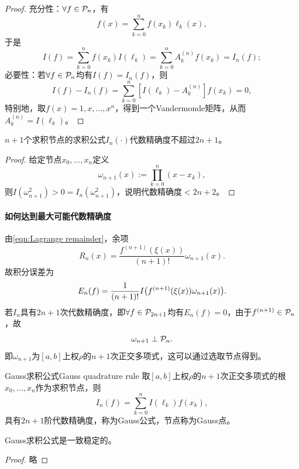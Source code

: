 \begin{proof}
    充分性：$\forall f \in \mathcal{P}_n$，有
    \[
        f(x) = \sum_{k=0}^nf(x_k)\ell_k(x),
    \]
    于是
    \[
        I(f) = \sum_{k=0}^nf(x_k)I(\ell_k) = \sum_{k=0}^nA_k^{(n)}f(x_k) = I_n(f);
    \]
    必要性：若$\forall f \in \mathcal{P}_n$均有$I(f) = I_n(f)$，则
    \[
        I(f) - I_n(f) = \sum_{k=0}^n[I(\ell_k) - A_k^{(n)}]f(x_k) = 0,
    \]
    特别地，取$f(x) = 1,x,\ldots,x^n$，得到一个Vandermonde矩阵，从而$A_k^{(n)} = I(\ell_k)$。
\end{proof}

\begin{theorem}
    {}{}
    $n + 1$个求积节点的求积公式$I_n(\cdot)$代数精确度不超过$2n + 1$。
\end{theorem}

\begin{proof}
    给定节点$x_0,\ldots,x_n$定义
    \begin{equation}\label{eq:na-nodal-polynomial}
        \omega_{n+1}(x) := \prod_{k=0}^n(x - x_k),
    \end{equation}
    则$I(\omega_{n+1}^2) > 0 = I_n(\omega_{n+1}^2)$，说明代数精确度$< 2n + 2$。
\end{proof}

\paragraph{如何达到最大可能代数精确度}

由\eqref{eqn:Lagrange remainder}，余项
\[
    R_n(x) = \frac{f^{(n+1)}(\xi(x))}{(n + 1)!}\omega_{n+1}(x).
\]
故积分误差为
\begin{equation}\label{eq:na-interpolation-quadrature-error}
    E_n(f) = \frac1{(n + 1)!}I\bigl(f^{(n+1)}(\xi(x))\omega_{n+1}(x)\bigr).
\end{equation}
若$I_n$具有$2n + 1$次代数精确度，即$\forall f \in \mathcal{P}_{2n+1}$均有$E_n(f) = 0$，由于$f^{(n+1)} \in \mathcal{P}_n$，故
\begin{equation}
    \omega_{n+1} \perp \mathcal{P}_n.
\end{equation}
即$\omega_{n+1}$为$[a,b]$上权$\rho$的$n + 1$次正交多项式，这可以通过选取节点得到。

\begin{theorem}
    {Gauss求积公式}{Gauss quadrature rule}
    取$[a,b]$上权$\rho$的$n + 1$次正交多项式的根$x_0,\ldots,x_n$作为求积节点，则
    \begin{equation}\label{eq:na-interpolatory-quadrature}
        I_n(f) = \sum_{k=0}^nI(\ell_k)f(x_k),
    \end{equation}
    具有$2n + 1$阶代数精确度，称为Gauss公式，节点称为Gauss点。
\end{theorem}

\begin{theorem}
    {}{}
    Gauss求积公式是一致稳定的。
\end{theorem}

\begin{proof}
    略
\end{proof}
